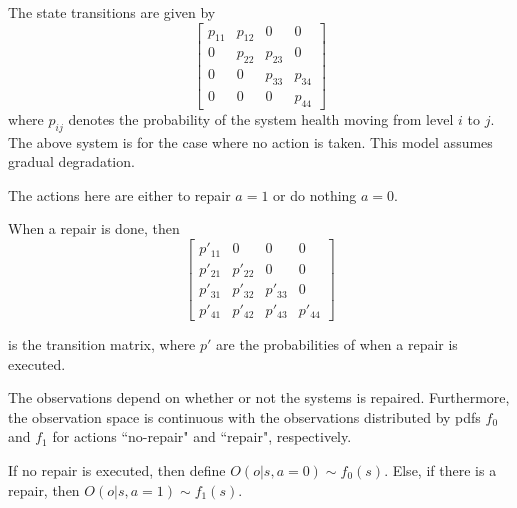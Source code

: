 \documentclass[english]{article}
\numberwithin{equation}{section}
\begin{document}
	The state transitions are given by 
	$$
	\begin{bmatrix}
	p_{11} & p_{12} & 0 & 0 \\
	0 & p_{22} & p_{23} & 0 \\
	0 & 0 & p_{33} & p_{34} \\
	0 & 0 & 0 & p_{44}
	\end{bmatrix}
	$$
	where $p_{ij}$ denotes the probability of the system health moving from level $i$ to $j$. The above system is for the case where no action is taken. This model assumes gradual degradation.
	
	The actions here are either to repair $a=1$ or do nothing $a=0$.
	
	When a repair is done, then
	$$
	\begin{bmatrix}
	p'_{11} & 0 & 0 & 0 \\
	p'_{21} & p'_{22} & 0 & 0 \\
	p'_{31} & p'_{32} & p'_{33} & 0 \\
	p'_{41} & p'_{42} & p'_{43} & p'_{44}
	\end{bmatrix}
	$$
	
	is the transition matrix, where $p'$ are the probabilities of when a repair is executed. 
	
	The observations depend on whether or not the systems is repaired. Furthermore, the observation space is continuous with the observations distributed by pdfs $f_0$ and $f_1$ for actions ``no-repair" and ``repair", respectively.
	
	If no repair is executed, then define $O(o|s,a=0) \sim f_0(s)$. Else, if there is a repair, then $O(o|s,a=1) \sim f_1(s)$.
	
%	
%	
	
\end{document}
